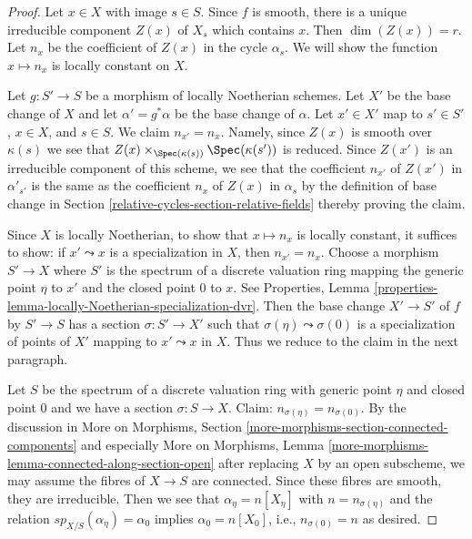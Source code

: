 \begin{proof}
Let $x \in X$ with image $s \in S$. Since $f$ is smooth, there is a
unique irreducible component $Z(x)$ of $X_s$ which contains $x$.
Then $\dim(Z(x)) = r$.
Let $n_x$ be the coefficient of $Z(x)$ in the cycle $\alpha_s$.
We will show the function $x \mapsto n_x$ is locally constant on $X$.

\medskip\noindent
Let $g : S' \to S$ be a morphism of locally Noetherian schemes.
Let $X'$ be the base change of $X$ and let $\alpha' = g^*\alpha$
be the base change of $\alpha$. Let $x' \in X'$ map to $s' \in S'$,
$x \in X$, and $s \in S$. We claim $n_{x'} = n_x$. Namely, since $Z(x)$
is smooth over $\kappa(s)$ we see that
$Z(x) \times_{\Spec(\kappa(s))} \Spec(\kappa(s'))$
is reduced. Since $Z(x')$ is an irreducible component
of this scheme, we see that the coefficient $n_{x'}$ of $Z(x')$
in $\alpha'_{s'}$ is the same as the coefficient $n_x$ of $Z(x)$
in $\alpha_s$ by the definition of base change in
Section \ref{relative-cycles-section-relative-fields}
thereby proving the claim.

\medskip\noindent
Since $X$ is locally Noetherian, to show that $x \mapsto n_x$
is locally constant, it suffices to show: if $x' \leadsto x$
is a specialization in $X$, then $n_{x'} = n_x$.
Choose a morphism $S' \to X$ where $S'$ is the spectrum of a discrete
valuation ring mapping the generic point $\eta$ to $x'$ and the closed point
$0$ to $x$. See Properties, Lemma
\ref{properties-lemma-locally-Noetherian-specialization-dvr}.
Then the base change $X' \to S'$ of $f$ by $S' \to S$
has a section $\sigma : S' \to X'$ such that $\sigma(\eta) \leadsto \sigma(0)$
is a specialization of points of $X'$ mapping to $x' \leadsto x$ in $X$.
Thus we reduce to the claim in the next paragraph.

\medskip\noindent
Let $S$ be the spectrum of a discrete valuation ring with
generic point $\eta$ and closed point $0$ and we have a section
$\sigma : S  \to X$. Claim: $n_{\sigma(\eta)} = n_{\sigma(0)}$.
By the discussion in More on Morphisms, Section
\ref{more-morphisms-section-connected-components} and especially
More on Morphisms, Lemma \ref{more-morphisms-lemma-connected-along-section-open}
after replacing $X$ by an open subscheme, we may assume the
fibres of $X \to S$ are connected. Since these fibres
are smooth, they are irreducible. Then we see that $\alpha_\eta = n[X_\eta]$
with $n = n_{\sigma(\eta)}$ and the relation $sp_{X/S}(\alpha_\eta) = \alpha_0$
implies $\alpha_0 = n[X_0]$, i.e., $n_{\sigma(0)} = n$ as desired.
\end{proof}

